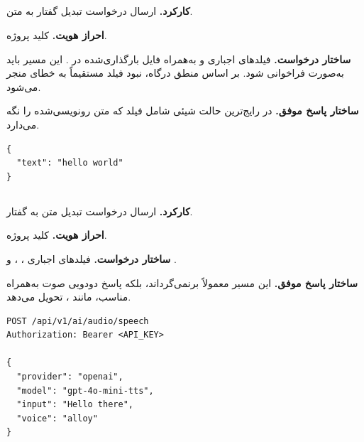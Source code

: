 
\subsection{}
\textbf{کارکرد.} ارسال درخواست تبدیل گفتار به متن.

\textbf{احراز هویت.} کلید پروژه.

\textbf{ساختار درخواست.} فیلدهای اجباری  و  به‌همراه
فایل بارگذاری‌شده در . این مسیر باید به‌صورت
 فراخوانی شود. بر اساس منطق درگاه، نبود فیلد
 مستقیماً به خطای  منجر می‌شود.

\textbf{ساختار پاسخ موفق.} در رایج‌ترین حالت شیئی شامل فیلد  که
متن رونویسی‌شده را نگه می‌دارد.

\begin{latin}
\begin{lstlisting}[style=jsonStyle]
{
  "text": "hello world"
}
\end{lstlisting}
\end{latin}


\subsection{}
\textbf{کارکرد.} ارسال درخواست تبدیل متن به گفتار.

\textbf{احراز هویت.} کلید پروژه.

\textbf{ساختار درخواست.} فیلدهای اجباری ، ،
 و .

\textbf{ساختار پاسخ موفق.} این مسیر معمولاً  برنمی‌گرداند، بلکه
پاسخ دودویی صوت به‌همراه  مناسب، مانند
، تحویل می‌دهد.

\begin{latin}
\begin{lstlisting}[style=jsonStyle]
POST /api/v1/ai/audio/speech
Authorization: Bearer <API_KEY>

{
  "provider": "openai",
  "model": "gpt-4o-mini-tts",
  "input": "Hello there",
  "voice": "alloy"
}
\end{lstlisting}
\end{latin}


